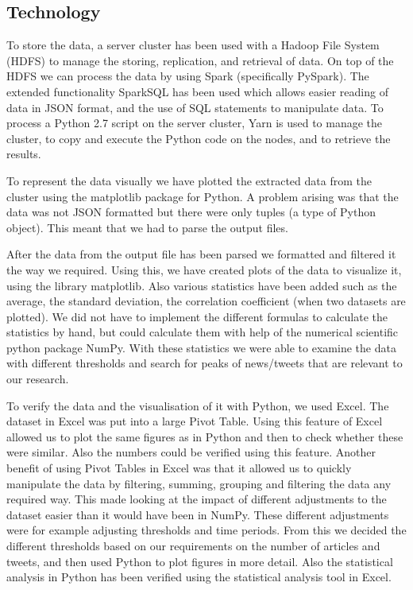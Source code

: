 \documentclass[paper=a4, fontsize=9px]{scrartcl} %
\numberwithin{equation}{section} %
\numberwithin{figure}{section} %
\numberwithin{table}{section} %
\begin{document}
\begin{multicols}{2}
\subsection{Technology}\label{sec:technology}

To store the data, a server cluster has been used with a Hadoop File System (HDFS) to manage the storing, replication, and retrieval of data. On top of the HDFS we can process the data by using Spark (specifically PySpark). The extended functionality SparkSQL has been used which allows easier reading of data in JSON format, and the use of SQL statements to manipulate data. 
To process a Python 2.7 script on the server cluster, Yarn is used to manage the cluster, to copy and execute the Python code on the nodes, and to retrieve the results. 

To represent the data visually we have plotted the extracted data from the cluster using the matplotlib package for Python. A problem arising was that the data was not JSON formatted but there were only tuples (a type of Python object).  This meant that we had to parse the output files.

After the data from the output file has been parsed we formatted and filtered it the way we required. Using this, we have created plots of the data to visualize it, using the library matplotlib. Also various statistics have been added such as the average, the standard deviation, the correlation coefficient (when two datasets are plotted). We did not have to implement the different formulas to calculate the statistics by hand, but could calculate them with help of the numerical scientific python package NumPy. With these statistics we were able to examine the data with different thresholds and search for peaks of news/tweets that are relevant to our research.

To verify the data and the visualisation of it with Python, we used Excel. The dataset in Excel was put into a large Pivot Table. Using this feature of Excel allowed us to plot the same figures as in Python and then to check whether these were similar. Also the numbers could be verified using this feature. 
Another benefit of using Pivot Tables in Excel was that it allowed us to quickly manipulate the data by filtering, summing, grouping and filtering the data any required way. This made looking at the impact of different adjustments to the dataset easier than it would have been in NumPy. These different adjustments were for example adjusting thresholds and time periods. From this we decided the different thresholds based on our requirements on the number of articles and tweets, and then used Python to plot figures in more detail. Also the statistical analysis in Python has been verified using the statistical analysis tool in Excel.




\end{multicols}
\end{document}
